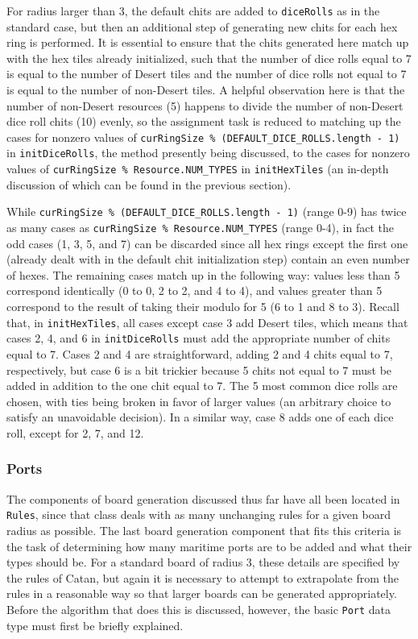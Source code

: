 \documentclass[pageno]{jpaper}
\begin{document}
\begin{doublespacing}
For radius larger than 3, the default chits are added to \lstinline$diceRolls$ as in the standard case, but then an additional step of generating new chits for each hex ring is performed. It is essential to ensure that the chits generated here match up with the hex tiles already initialized, such that the number of dice rolls equal to 7 is equal to the number of Desert tiles and the number of dice rolls not equal to 7 is equal to the number of non-Desert tiles. A helpful observation here is that the number of non-Desert resources (5) happens to divide the number of non-Desert dice roll chits (10) evenly, so the assignment task is reduced to matching up the cases for nonzero values of \lstinline$curRingSize % (DEFAULT_DICE_ROLLS.length - 1)$ in \lstinline$initDiceRolls$, the method presently being discussed, to the cases for nonzero values of \lstinline$curRingSize % Resource.NUM_TYPES$ in \lstinline$initHexTiles$ (an in-depth discussion of which can be found in the previous section).

While \lstinline$curRingSize % (DEFAULT_DICE_ROLLS.length - 1)$ (range 0-9) has twice as many cases as \lstinline$curRingSize % Resource.NUM_TYPES$ (range 0-4), in fact the odd cases (1, 3, 5, and 7) can be discarded since all hex rings except the first one (already dealt with in the default chit initialization step) contain an even number of hexes. The remaining cases match up in the following way: values less than 5 correspond identically (0 to 0, 2 to 2, and 4 to 4), and values greater than 5 correspond to the result of taking their modulo for 5 (6 to 1 and 8 to 3). Recall that, in \lstinline$initHexTiles$, all cases except case 3 add Desert tiles, which means that cases 2, 4, and 6 in \lstinline$initDiceRolls$ must add the appropriate number of chits equal to 7. Cases 2 and 4 are straightforward, adding 2 and 4 chits equal to 7, respectively, but case 6 is a bit trickier because 5 chits not equal to 7 must be added in addition to the one chit equal to 7. The 5 most common dice rolls are chosen, with ties being broken in favor of larger values (an arbitrary choice to satisfy an unavoidable decision). In a similar way, case 8 adds one of each dice roll, except for 2, 7, and 12.

\hypertarget{sec:ports}{}
\subsubsection{Ports}

The components of board generation discussed thus far have all been located in \lstinline$Rules$, since that class deals with as many unchanging rules for a given board radius as possible. The last board generation component that fits this criteria is the task of determining how many maritime ports are to be added and what their types should be. For a standard board of radius 3, these details are specified by the rules of Catan, but again it is necessary to attempt to extrapolate from the rules in a reasonable way so that larger boards can be generated appropriately. Before the algorithm that does this is discussed, however, the basic \lstinline$Port$ data type must first be briefly explained. 


\end{doublespacing}
\end{document}
